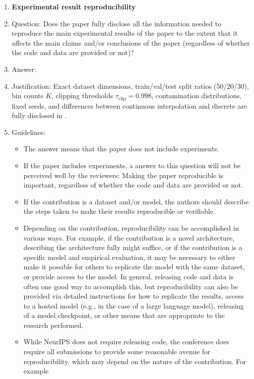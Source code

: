 \documentclass{article}
\theoremstyle{plain}
\theoremstyle{definition}
\theoremstyle{remark}
\begin{document}
\begin{enumerate}
\item {\bf Experimental result reproducibility}
    \item[] Question: Does the paper fully disclose all the information needed to reproduce the main experimental results of the paper to the extent that it affects the main claims and/or conclusions of the paper (regardless of whether the code and data are provided or not)?
    \item[] Answer: \answerYes{}
    \item[] Justification: Exact dataset dimensions, train/val/test split ratios (50/20/30), bin counts $K$, clipping thresholds $\tau_{\mathrm{clip}}=0.998$, contamination distributions, fixed seeds, and differences between continuous interpolation and discrete  are fully disclosed in .
    \item[] Guidelines:
    \begin{itemize}
        \item The answer \answerNA{} means that the paper does not include experiments.
        \item If the paper includes experiments, a \answerNo{} answer to this question will not be perceived well by the reviewers: Making the paper reproducible is important, regardless of whether the code and data are provided or not.
        \item If the contribution is a dataset and\slash or model, the authors should describe the steps taken to make their results reproducible or verifiable.
        \item Depending on the contribution, reproducibility can be accomplished in various ways. For example, if the contribution is a novel architecture, describing the architecture fully might suffice, or if the contribution is a specific model and empirical evaluation, it may be necessary to either make it possible for others to replicate the model with the same dataset, or provide access to the model. In general. releasing code and data is often one good way to accomplish this, but reproducibility can also be provided via detailed instructions for how to replicate the results, access to a hosted model (e.g., in the case of a large language model), releasing of a model checkpoint, or other means that are appropriate to the research performed.
        \item While NeurIPS does not require releasing code, the conference does require all submissions to provide some reasonable avenue for reproducibility, which may depend on the nature of the contribution. For example

\end{itemize}
\end{enumerate}
\end{document}
